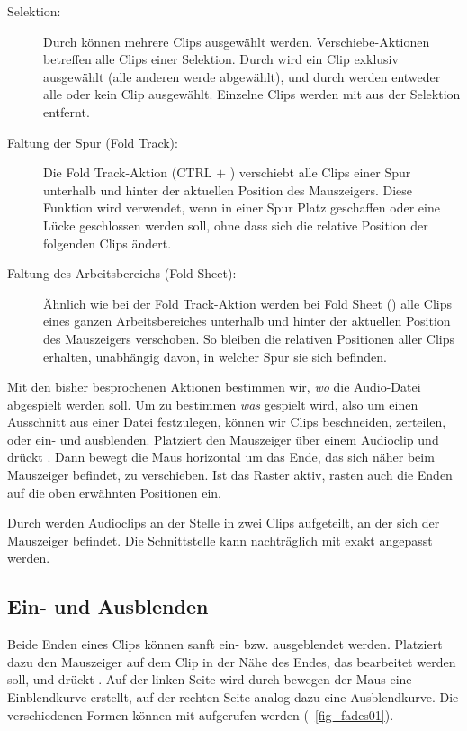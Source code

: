 \begin{description}
 \item[Selektion:] Durch  können mehrere Clips ausgewählt werden. Verschiebe-Aktionen betreffen alle Clips einer Selektion. Durch  wird ein Clip exklusiv ausgewählt (alle anderen werde abgewählt), und durch  werden entweder alle oder kein Clip ausgewählt. Einzelne Clips werden mit  aus der Selektion entfernt.
 \item[Faltung der Spur (Fold Track):] Die Fold Track-Aktion (CTRL $+$ ) verschiebt alle Clips einer Spur unterhalb und hinter der aktuellen Position des Mauszeigers. Diese Funktion wird verwendet, wenn in einer Spur Platz geschaffen oder eine Lücke geschlossen werden soll, ohne dass sich die relative Position der folgenden Clips ändert.
 \item[Faltung des Arbeitsbereichs (Fold Sheet):] Ähnlich wie bei der Fold Track-Aktion werden bei Fold Sheet () alle Clips eines ganzen Arbeitsbereiches unterhalb und hinter der aktuellen Position des Mauszeigers verschoben. So bleiben die relativen Positionen aller Clips erhalten, unabhängig davon, in welcher Spur sie sich befinden.
\end{description}

Mit den bisher besprochenen Aktionen bestimmen wir, \emph{wo} die Audio-Datei abgespielt werden soll. Um zu bestimmen \emph{was} gespielt wird, also um einen Ausschnitt aus einer Datei festzulegen, können wir Clips beschneiden, zerteilen, oder ein- und ausblenden. Platziert den Mauszeiger über einem Audioclip und drückt . Dann bewegt die Maus horizontal um das Ende, das sich näher beim Mauszeiger befindet, zu verschieben. Ist das Raster aktiv, rasten auch die Enden auf die oben erwähnten Positionen ein.

Durch  werden Audioclips an der Stelle in zwei Clips aufgeteilt, an der sich der Mauszeiger befindet. Die Schnittstelle kann nachträglich mit  exakt angepasst werden.

\subsection{Ein- und Ausblenden}
Beide Enden eines Clips können sanft ein- bzw. ausgeblendet werden. Platziert dazu den Mauszeiger auf dem Clip in der Nähe des Endes, das bearbeitet werden soll, und drückt . Auf der linken Seite wird durch bewegen der Maus eine Einblendkurve erstellt, auf der rechten Seite analog dazu eine Ausblendkurve. Die verschiedenen Formen können mit  aufgerufen werden (\FigB~\ref{fig_fades01}).

